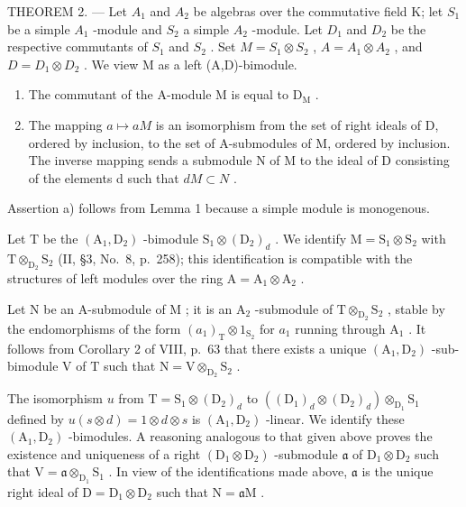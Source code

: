 THEOREM 2. --- Let \(A_{1}\) and \(A_{2}\) be algebras over the commutative field K; let \(S_{1}\) be a simple \(A_{1}\) -module and \(S_{2}\) a simple \(A_{2}\) -module. Let \(D_{1}\) and \(D_{2}\) be the respective commutants of \(S_{1}\) and \(S_{2}\) . Set \(M = S_{1} \otimes S_{2}\) , \(A = A_{1} \otimes A_{2}\) , and \(D = D_{1} \otimes D_{2}\) . We view M as a left (A,D)-bimodule.

\begin{enumerate}
\def\labelenumi{\alph{enumi})}
\item
  The commutant of the A-module M is equal to \(\mathrm{D}_{\mathrm{M}}\) .
\item
  The mapping \(a \mapsto aM\) is an isomorphism from the set of right ideals of D, ordered by inclusion, to the set of A-submodules of M, ordered by inclusion. The inverse mapping sends a submodule N of M to the ideal of D consisting of the elements d such that \(dM \subset N\) .
\end{enumerate}

Assertion a) follows from Lemma 1 because a simple module is monogenous.

Let \(\mathrm{T}\) be the \((\mathrm{A}_1, \mathrm{D}_2)\) -bimodule \(\mathrm{S}_1 \otimes (\mathrm{D}_2)_d\) . We identify \(\mathrm{M} = \mathrm{S}_1 \otimes \mathrm{S}_2\) with \(\mathrm{T} \otimes_{\mathrm{D}_2} \mathrm{S}_2\) (II, §3, No.~8, p.~258); this identification is compatible with the structures of left modules over the ring \(\mathrm{A} = \mathrm{A}_1 \otimes \mathrm{A}_2\) .

Let \(\mathrm{N}\) be an A-submodule of \(\mathrm{M}\) ; it is an \(\mathrm{A}_2\) -submodule of \(\mathrm{T} \otimes_{\mathrm{D}_2} \mathrm{S}_2\) , stable by the endomorphisms of the form \((a_1)_\mathrm{T} \otimes 1_{\mathrm{S}_2}\) for \(a_1\) running through \(\mathrm{A}_1\) . It follows from Corollary 2 of VIII, p.~63 that there exists a unique \((\mathrm{A}_1, \mathrm{D}_2)\) -sub-bimodule \(\mathrm{V}\) of \(\mathrm{T}\) such that \(\mathrm{N} = \mathrm{V} \otimes_{\mathrm{D}_2} \mathrm{S}_2\) .

The isomorphism \(u\) from \(\mathrm{T} = \mathrm{S}_1 \otimes (\mathrm{D}_2)_d\) to \(((\mathrm{D}_1)_d \otimes (\mathrm{D}_2)_d) \otimes_{\mathrm{D}_1} \mathrm{S}_1\) defined by \(u(s \otimes d) = 1 \otimes d \otimes s\) is \((\mathrm{A}_1, \mathrm{D}_2)\) -linear. We identify these \((\mathrm{A}_1, \mathrm{D}_2)\) -bimodules. A reasoning analogous to that given above proves the existence and uniqueness of a right \((\mathrm{D}_1 \otimes \mathrm{D}_2)\) -submodule \(\mathfrak{a}\) of \(\mathrm{D}_1 \otimes \mathrm{D}_2\) such that \(\mathrm{V} = \mathfrak{a} \otimes_{\mathrm{D}_1} \mathrm{S}_1\) . In view of the identifications made above, \(\mathfrak{a}\) is the unique right ideal of \(\mathrm{D} = \mathrm{D}_1 \otimes \mathrm{D}_2\) such that \(\mathrm{N} = \mathfrak{a}\mathrm{M}\) .

